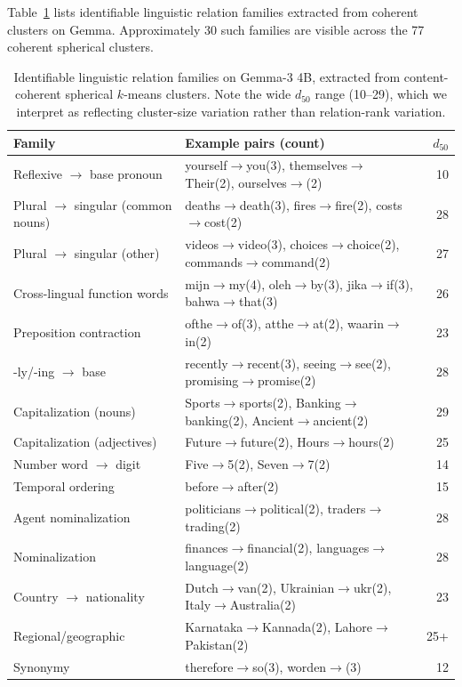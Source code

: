 \documentclass[11pt,letterpaper]{article}
\begin{document}
Table~\ref{tab:gemma-families} lists identifiable linguistic relation families extracted from coherent clusters on Gemma. Approximately 30 such families are visible across the 77 coherent spherical clusters.

\begin{table}[ht]
\centering
\small
\begin{tabular}{llr}
\toprule
Family & Example pairs (count) & $d_{50}$ \\
\midrule
Reflexive $\to$ base pronoun        & yourself$\to$you(3), themselves$\to$Their(2), ourselves$\to$(2) & 10 \\
Plural $\to$ singular (common nouns) & deaths$\to$death(3), fires$\to$fire(2), costs$\to$cost(2) & 28 \\
Plural $\to$ singular (other)        & videos$\to$video(3), choices$\to$choice(2), commands$\to$command(2) & 27 \\
Cross-lingual function words        & mijn$\to$my(4), oleh$\to$by(3), jika$\to$if(3), bahwa$\to$that(3) & 26 \\
Preposition contraction             & ofthe$\to$of(3), atthe$\to$at(2), waarin$\to$in(2) & 23 \\
-ly/-ing $\to$ base                  & recently$\to$recent(3), seeing$\to$see(2), promising$\to$promise(2) & 28 \\
Capitalization (nouns)              & Sports$\to$sports(2), Banking$\to$banking(2), Ancient$\to$ancient(2) & 29 \\
Capitalization (adjectives)         & Future$\to$future(2), Hours$\to$hours(2) & 25 \\
Number word $\to$ digit             & Five$\to$5(2), Seven$\to$7(2) & 14 \\
Temporal ordering                   & before$\to$after(2) & 15 \\
Agent nominalization                & politicians$\to$political(2), traders$\to$trading(2) & 28 \\
Nominalization                      & finances$\to$financial(2), languages$\to$language(2) & 28 \\
Country $\to$ nationality           & Dutch$\to$van(2), Ukrainian$\to$ukr(2), Italy$\to$Australia(2) & 23 \\
Regional/geographic                 & Karnataka$\to$Kannada(2), Lahore$\to$Pakistan(2) & 25+ \\
Synonymy                            & therefore$\to$so(3), worden$\to$(3) & 12 \\
\bottomrule
\end{tabular}
\caption{Identifiable linguistic relation families on Gemma-3 4B, extracted from content-coherent spherical $k$-means clusters. Note the wide $d_{50}$ range (10--29), which we interpret as reflecting cluster-size variation rather than relation-rank variation.}
\label{tab:gemma-families}
\end{table}
\end{document}
